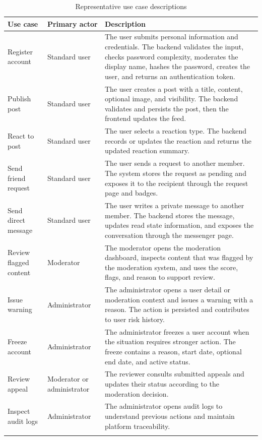 \begin{longtable}{|m{3.2cm}|m{3.2cm}|m{7.6cm}|}
\hline
\textbf{Use case} & \textbf{Primary actor} & \textbf{Description} \\
\hline
Register account & Standard user & The user submits personal information and credentials. The backend validates the input, checks password complexity, moderates the display name, hashes the password, creates the user, and returns an authentication token. \\
\hline
Publish post & Standard user & The user creates a post with a title, content, optional image, and visibility. The backend validates and persists the post, then the frontend updates the feed. \\
\hline
React to post & Standard user & The user selects a reaction type. The backend records or updates the reaction and returns the updated reaction summary. \\
\hline
Send friend request & Standard user & The user sends a request to another member. The system stores the request as pending and exposes it to the recipient through the request page and badges. \\
\hline
Send direct message & Standard user & The user writes a private message to another member. The backend stores the message, updates read state information, and exposes the conversation through the messenger page. \\
\hline
Review flagged content & Moderator & The moderator opens the moderation dashboard, inspects content that was flagged by the moderation system, and uses the score, flags, and reason to support review. \\
\hline
Issue warning & Administrator & The administrator opens a user detail or moderation context and issues a warning with a reason. The action is persisted and contributes to user risk history. \\
\hline
Freeze account & Administrator & The administrator freezes a user account when the situation requires stronger action. The freeze contains a reason, start date, optional end date, and active status. \\
\hline
Review appeal & Moderator or administrator & The reviewer consults submitted appeals and updates their status according to the moderation decision. \\
\hline
Inspect audit logs & Administrator & The administrator opens audit logs to understand previous actions and maintain platform traceability. \\
\hline
\caption{Representative use case descriptions}\\
\end{longtable}

